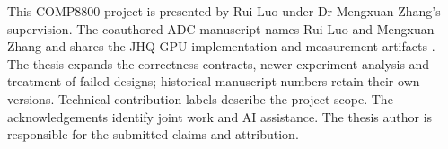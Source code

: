 This COMP8800 project is presented by Rui Luo under Dr Mengxuan Zhang's
supervision. The coauthored ADC manuscript names Rui Luo and Mengxuan Zhang
and shares the JHQ-GPU implementation and measurement artifacts
\cite{adc_artifact}. The thesis
expands the correctness contracts, newer experiment analysis and treatment
of failed designs; historical manuscript numbers retain their own versions.
Technical contribution labels describe the project scope. The acknowledgements
identify joint work and AI assistance.
The thesis author is responsible for the submitted claims and attribution.

